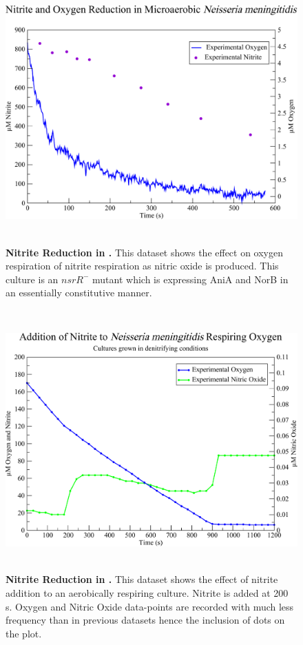 \begin{figure}[tbp]
 \centering
 \includegraphics[height=10cm]{./07-nitritereduction/data/dataset1.pdf}
 \caption[Nitrite Reduction in \Nsm{}]{{\bf Nitrite Reduction in \Nsm{}.} This dataset shows the effect on oxygen respiration of nitrite respiration as nitric oxide is produced. This culture is an $nsrR^-$ mutant which is expressing AniA and NorB in an essentially constitutive manner.
 \label{fig:nitriteds1}}
\end{figure}

\begin{figure}[tbp]
 \centering
 \includegraphics[height=10cm]{./07-nitritereduction/data/dataset2.pdf}
 \caption[Nitrite Reduction in \Nsm{}]{{\bf Nitrite Reduction in \Nsm{}.} This dataset shows the effect of nitrite addition to an aerobically respiring culture. Nitrite is added at 200 s. Oxygen and Nitric Oxide data-points are recorded with much less frequency than in previous datasets hence the inclusion of dots on the plot.
 \label{fig:nitriteds2}}
\end{figure}

